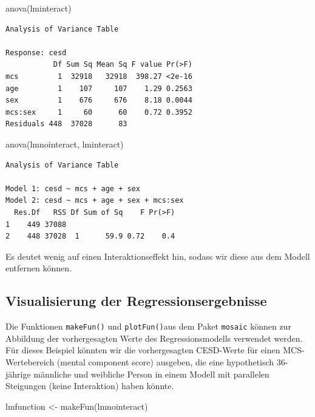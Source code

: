 \documentclass[
  ngerman,
]{scrbook}
\newenvironment{Shaded}{\begin{snugshade}}{\end{snugshade}}
\newcommand{\FunctionTok}[1]{\textcolor[rgb]{0.00,0.00,0.00}{#1}}
\newcommand{\NormalTok}[1]{#1}
\newcommand{\OtherTok}[1]{\textcolor[rgb]{0.56,0.35,0.01}{#1}}
\begin{document}
\begin{Shaded}
\begin{Highlighting}[]
\FunctionTok{anova}\NormalTok{(lminteract)}
\end{Highlighting}
\end{Shaded}

\begin{verbatim}
Analysis of Variance Table

Response: cesd
           Df Sum Sq Mean Sq F value Pr(>F)
mcs         1  32918   32918  398.27 <2e-16
age         1    107     107    1.29 0.2563
sex         1    676     676    8.18 0.0044
mcs:sex     1     60      60    0.72 0.3952
Residuals 448  37028      83               
\end{verbatim}

\begin{Shaded}
\begin{Highlighting}[]
\FunctionTok{anova}\NormalTok{(lmnointeract, lminteract)}
\end{Highlighting}
\end{Shaded}

\begin{verbatim}
Analysis of Variance Table

Model 1: cesd ~ mcs + age + sex
Model 2: cesd ~ mcs + age + sex + mcs:sex
  Res.Df   RSS Df Sum of Sq    F Pr(>F)
1    449 37088                         
2    448 37028  1      59.9 0.72    0.4
\end{verbatim}

Es deutet wenig auf einen Interaktionseffekt hin, sodass wir diese aus dem Modell entfernen können.

\hypertarget{VisReg}{%
\subsection{Visualisierung der Regressionsergebnisse}\label{VisReg}}

Die Funktionen \texttt{makeFun()} und \texttt{plotFun()}aus dem Paket \texttt{mosaic} können zur Abbildung der vorhergesagten Werte des Regressionsmodells verwendet werden. Für dieses Beispiel könnten wir die vorhergesagten CESD-Werte für einen MCS-Wertebereich (mental component score) ausgeben, die eine hypothetisch 36-jährige männliche und weibliche Person in einem Modell mit parallelen Steigungen (keine Interaktion) haben könnte.

\begin{Shaded}
\begin{Highlighting}[]
\NormalTok{lmfunction }\OtherTok{\textless{}{-}} \FunctionTok{makeFun}\NormalTok{(lmnointeract)}
\end{Highlighting}
\end{Shaded}
\end{document}
